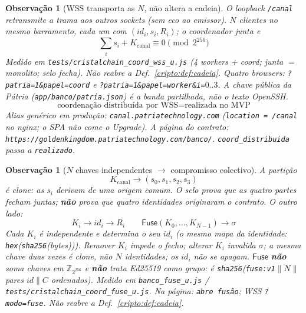 \documentclass[11pt,a4paper]{article}
\newcommand{\code}[1]{\texttt{\small #1}}
\newtheorem{observacao}[teorema]{Observação}
\begin{document}
\begin{observacao}[WSS transporta as $N$, não altera a cadeia]\label{cripto:obs:coord-wss}
O loopback \code{/canal} retransmite a trama aos outros sockets
(sem eco ao emissor). $N$ clientes no mesmo barramento, cada um com
$(id_i,s_i,R_i)$; o coordenador junta e
\[
\boxed{\;
\sum_i s_i+K_{\mathrm{canal}}\equiv 0\pmod{2^{256}}
\;}
\]
Medido em \code{tests/cristalchain\_coord\_wss\_u.js}
(4 workers + coord; junta $=$ monolito; selo fecha).
Não reabre a Def.~\ref{cripto:def:cadeia}.
Quatro browsers: \code{?patria=1\&papel=coord} e
\code{?patria=1\&papel=worker\&i=}$0..3$.
A chave pública da Pátria (\code{app/banco/patria.json}) é a banda
partilhada, não o texto OpenSSH.
\[
\boxed{\;
\text{coordenação distribuída por WSS}
=
\text{realizada no MVP}
\;}
\]
Alias genérico em produção: \code{canal.patriatechnology.com}
(\code{location = /canal} no nginx; o SPA não come o Upgrade).
A página do contrato: \code{https://goldenkingdom.patriatechnology.com/banco/}.
\code{coord\_distribuida} passa a \texttt{realizado}.
\end{observacao}

\begin{observacao}[$N$ chaves independentes $\to$ compromisso colectivo]\label{cripto:obs:coord-fuse}
A partição
\[
\boxed{\;K_{\mathrm{canal}}\longrightarrow(s_0,s_1,s_2,s_3)\;}
\]
é clone: as $s_i$ derivam de uma origem comum. O selo prova que as
quatro partes fecham juntas; \textbf{não} prova que quatro identidades
originaram o contrato.
O outro lado:
\[
\boxed{\;
K_i\longrightarrow id_i\longrightarrow R_i
\qquad
\mathsf{Fuse}(K_0,\ldots,K_{N-1})\longrightarrow\sigma
\;}
\]
Cada $K_i$ é independente e determina o seu $id_i$ (o mesmo mapa da
identidade: \code{hex}(\code{sha256}(bytes))). Remover $K_i$ impede o
fecho; alterar $K_i$ invalida $\sigma$; a mesma chave duas vezes é
clone, não $N$ identidades; os $id_i$ não se apagam.
$\mathsf{Fuse}$ \textbf{não} soma chaves em $\mathbb{Z}_{2^{256}}$ e
\textbf{não} trata Ed25519 como grupo: é
\code{sha256}(\code{fuse:v1}$\|N\|$ pares $id\|C$ ordenados).
Medido em \code{banco\_fuse\_u.js} /
\code{tests/cristalchain\_coord\_fuse\_u.js}.
Na página: \code{abre fusão}; WSS \code{?modo=fuse}.
Não reabre a Def.~\ref{cripto:def:cadeia}.
\end{observacao}
\end{document}
